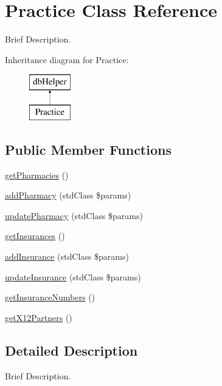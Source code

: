 \hypertarget{class_practice}{\section{\-Practice \-Class \-Reference}
\label{class_practice}
}


\-Brief \-Description.  


\-Inheritance diagram for \-Practice\-:\begin{figure}[H]
\begin{center}
\leavevmode
\includegraphics[height=2.000000cm]{class_practice}
\end{center}
\end{figure}
\subsection*{\-Public \-Member \-Functions}
\begin{DoxyCompactItemize}
\item 
\hyperlink{class_practice_a15ab21b019bb6522c9be8019a7262da8}{get\-Pharmacies} ()
\item 
\hyperlink{class_practice_a9f19742697cc1367917e8bf2bcfba89e}{add\-Pharmacy} (std\-Class \$params)
\item 
\hyperlink{class_practice_a2c78fe7f408e107dcde34fcd4b76379d}{update\-Pharmacy} (std\-Class \$params)
\item 
\hyperlink{class_practice_a1b39dfca1f04a215e2a271387cb9ba2d}{get\-Insurances} ()
\item 
\hyperlink{class_practice_a366861cfcd97cf2564064972cbf6d73f}{add\-Insurance} (std\-Class \$params)
\item 
\hyperlink{class_practice_a581b0c2e6cc880e1392fa8357ff77cb5}{update\-Insurance} (std\-Class \$params)
\item 
\hyperlink{class_practice_aafc20a8db7d64b9842aaf5a82309fb27}{get\-Insurance\-Numbers} ()
\item 
\hyperlink{class_practice_ab7e7020902dec3f55b4c41c70c640d81}{get\-X12\-Partners} ()
\end{DoxyCompactItemize}


\subsection{\-Detailed \-Description}
\-Brief \-Description. 


